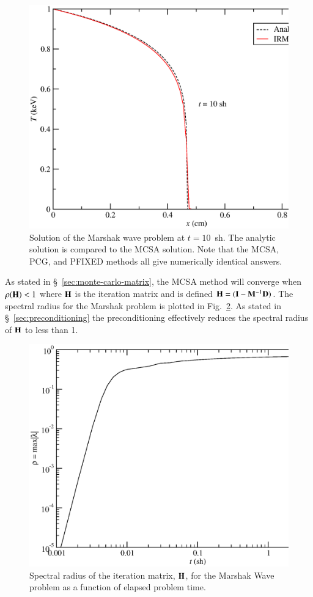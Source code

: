 \documentclass[preprint,12pt]{elsarticle}
\newcommand{\vI}{\ensuremath{\ve{I}}}
\begin{document}
\begin{figure}[htpb!]
  \centerline{
    \includegraphics[width=5in,clip]{marshak_10.eps}}
  \caption{
    Solution of the Marshak wave problem at $t=10$~sh.  The analytic
    solution is compared to the MCSA solution.  Note that the MCSA,
    PCG, and PFIXED methods all give numerically identical answers.}
  \label{fig:marshak_10}
\end{figure}

As stated in \S~\ref{sec:monte-carlo-matrix}, the MCSA method will
converge when $\rho(\mathbf{H})< 1$ where $\mathbf{H}$ is the iteration matrix
and is defined $\ve{H} = (\vI - \ve{M}^{-1}\ve{D})$.  The spectral
radius for the Marshak problem is plotted in
Fig.~\ref{fig:marshak_spectral}.  As stated in
\S~\ref{sec:preconditioning} the preconditioning effectively reduces
the spectral radius of $\mathbf{H}$ to less than 1.

\begin{figure}[htpb!]
  \centerline{
    \includegraphics[width=5in,clip]{spectral_radius.eps}}
  \caption{Spectral radius of the iteration matrix, $\mathbf{H}$, for the
    Marshak Wave problem as a function of elapsed problem time.}
  \label{fig:marshak_spectral}
\end{figure}
\end{document}
